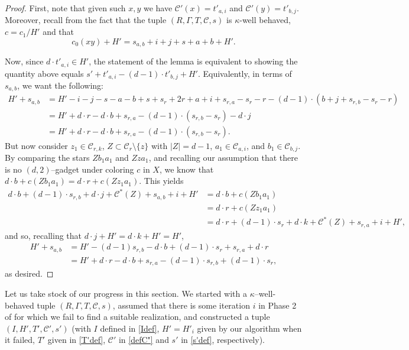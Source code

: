\documentclass{article}
\newcommand{\cC}{\mathcal{C} }
\theoremstyle{definition}
\begin{document}
\begin{proof}
First, note that given such $x, y$ we have $\cC'(x)=t'_{a, i}$ and $\cC'(y)=t'_{b, j}$. Moreover, recall from the fact that the tuple $(R, \Gamma, T, \cC, s)$ is $\kappa$-well behaved, $c=c_1/H'$ and  that \[c_0(xy)+H' = s_{a,b} + i + j +s + a + b + H'.\]

Now, since $d\cdot t'_{a,i} \in H'$, the statement of the lemma is equivalent to showing the quantity above equals $s' +t'_{a,i}-(d-1)\cdot t'_{b,j}+H'$. Equivalently, in terms of $s_{a,b}$, we want the following:
$$\begin{aligned}
    H'+s_{a,b}&=H'-i-j-s-a-b+s+s_r+2r+a+i+s_{r,a}-s_r-r-(d-1)\cdot (b+j+s_{r,b}-s_r-r)\\
    &=H'+d\cdot r-d\cdot b+s_{r,a}-(d-1)\cdot (s_{r,b}-s_r)-d\cdot j\\
    &=H'+d\cdot r-d\cdot b+s_{r,a}-(d-1)\cdot (s_{r,b}-s_r).
\end{aligned}$$
But now consider $ z_1 \in \cC_{r,k}$, $Z\subset \cC_r\setminus \{z\}$ with $|Z|=d-1$, $a_1\in \cC_{a,i}$, and $b_1\in \cC_{b,j}$. By comparing the stars $Zb_1a_1$ and $Zza_1$, and recalling our assumption that there is no $(d, 2)$--gadget under coloring $c$ in $X$,  we know that  $d\cdot b + c(Zb_1a_1) 
 = d\cdot r+ c(Zz_1a_1)$. This yields 
\begin{align*}
d\cdot b + (d-1)\cdot s_{r,b}+ d\cdot j+\cC^*(Z)+ s_{a,b} + i+H'
&= d\cdot b + c(Zb_1a_1)\\
&= d\cdot r+ c(Zz_1a_1) \\
&= d\cdot r + (d-1)\cdot s_r+d\cdot k+\cC^*(Z)+s_{r,a} +i+H',
\end{align*}
and so, recalling that $d\cdot j+H'=d\cdot k+H'=H'$, 
$$
\begin{aligned}H'+s_{a,b}&=H'-(d-1)s_{r,b} - d\cdot b+   (d-1)\cdot s_r+s_{r,a} + d\cdot r \\
&=H'+d\cdot r-d\cdot b+s_{r,a}-(d-1)\cdot s_{r,b}  +   (d-1)\cdot s_r,
\end{aligned}$$ as desired.
\end{proof}

Let us take stock of our progress in this section. We started with a $\kappa$--well-behaved tuple $(R, \Gamma, T, \cC, s)$, assumed that there is some iteration $i$ in Phase 2 of  for which we fail to find a suitable realization, and constructed a tuple $(I, H', T', \cC', s')$ (with $I$ defined in \cref{Idef}, $H'=H'_i$ given by our algorithm when it failed, $T'$ given in \cref{T'def}, $\cC'$ in \cref{defC"} and $s'$ in \cref{s'def}, respectively).
\end{document}
